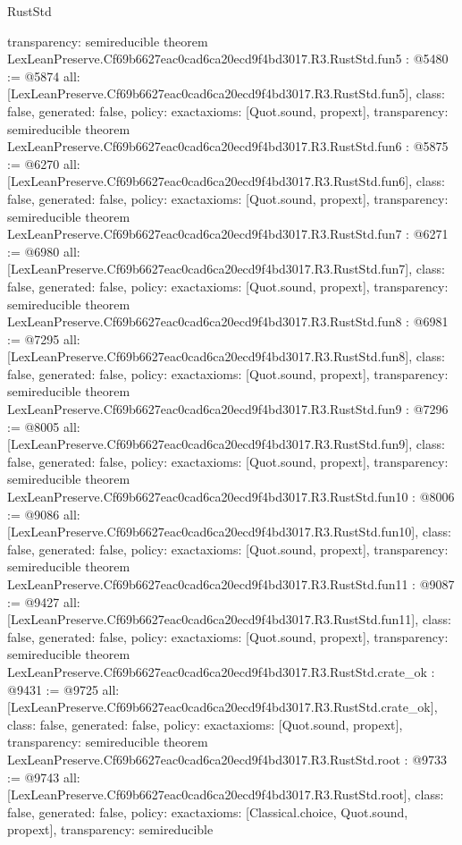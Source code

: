 \begin{lexlean}{RustStd}
\begin{coremodule}
{  transparency: semireducible
}
theorem LexLeanPreserve.Cf69b6627eac0cad6ca20ecd9f4bd3017.R3.RustStd.fun5 : @5480 := @5874 {
  all: [LexLeanPreserve.Cf69b6627eac0cad6ca20ecd9f4bd3017.R3.RustStd.fun5],
  class: false,
  generated: false,
  policy: exact{axioms: [Quot.sound, propext]},
  transparency: semireducible
}
theorem LexLeanPreserve.Cf69b6627eac0cad6ca20ecd9f4bd3017.R3.RustStd.fun6 : @5875 := @6270 {
  all: [LexLeanPreserve.Cf69b6627eac0cad6ca20ecd9f4bd3017.R3.RustStd.fun6],
  class: false,
  generated: false,
  policy: exact{axioms: [Quot.sound, propext]},
  transparency: semireducible
}
theorem LexLeanPreserve.Cf69b6627eac0cad6ca20ecd9f4bd3017.R3.RustStd.fun7 : @6271 := @6980 {
  all: [LexLeanPreserve.Cf69b6627eac0cad6ca20ecd9f4bd3017.R3.RustStd.fun7],
  class: false,
  generated: false,
  policy: exact{axioms: [Quot.sound, propext]},
  transparency: semireducible
}
theorem LexLeanPreserve.Cf69b6627eac0cad6ca20ecd9f4bd3017.R3.RustStd.fun8 : @6981 := @7295 {
  all: [LexLeanPreserve.Cf69b6627eac0cad6ca20ecd9f4bd3017.R3.RustStd.fun8],
  class: false,
  generated: false,
  policy: exact{axioms: [Quot.sound, propext]},
  transparency: semireducible
}
theorem LexLeanPreserve.Cf69b6627eac0cad6ca20ecd9f4bd3017.R3.RustStd.fun9 : @7296 := @8005 {
  all: [LexLeanPreserve.Cf69b6627eac0cad6ca20ecd9f4bd3017.R3.RustStd.fun9],
  class: false,
  generated: false,
  policy: exact{axioms: [Quot.sound, propext]},
  transparency: semireducible
}
theorem LexLeanPreserve.Cf69b6627eac0cad6ca20ecd9f4bd3017.R3.RustStd.fun10 : @8006 := @9086 {
  all: [LexLeanPreserve.Cf69b6627eac0cad6ca20ecd9f4bd3017.R3.RustStd.fun10],
  class: false,
  generated: false,
  policy: exact{axioms: [Quot.sound, propext]},
  transparency: semireducible
}
theorem LexLeanPreserve.Cf69b6627eac0cad6ca20ecd9f4bd3017.R3.RustStd.fun11 : @9087 := @9427 {
  all: [LexLeanPreserve.Cf69b6627eac0cad6ca20ecd9f4bd3017.R3.RustStd.fun11],
  class: false,
  generated: false,
  policy: exact{axioms: [Quot.sound, propext]},
  transparency: semireducible
}
theorem LexLeanPreserve.Cf69b6627eac0cad6ca20ecd9f4bd3017.R3.RustStd.crate_ok : @9431 := @9725 {
  all: [LexLeanPreserve.Cf69b6627eac0cad6ca20ecd9f4bd3017.R3.RustStd.crate_ok],
  class: false,
  generated: false,
  policy: exact{axioms: [Quot.sound, propext]},
  transparency: semireducible
}
theorem LexLeanPreserve.Cf69b6627eac0cad6ca20ecd9f4bd3017.R3.RustStd.root : @9733 := @9743 {
  all: [LexLeanPreserve.Cf69b6627eac0cad6ca20ecd9f4bd3017.R3.RustStd.root],
  class: false,
  generated: false,
  policy: exact{axioms: [Classical.choice, Quot.sound, propext]},
  transparency: semireducible
}


\end{coremodule}
\end{lexlean}
